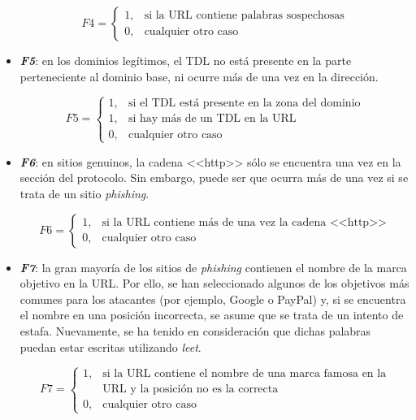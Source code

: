\begin{itemize}
	\[F4 = \left\{ \begin{array}{lr} 1, & \text{si la URL contiene palabras sospechosas}\\ 
	0, & \text{cualquier otro caso} \label{eqn:phishing_f4} \end{array} \right. \]

	\item \textit{\textbf{F5}}: en los dominios legítimos, el TDL no está presente en la parte perteneciente al dominio base, ni ocurre más de una vez en la dirección.
	
	\[F5 = \left\{ \begin{array}{lr} 1, & \text{si el TDL está presente en la zona del dominio}\\ 
	1, & \text{si hay más de un TDL en la URL} \\
	0, & \text{cualquier otro caso} \label{eqn:phishing_f5} \end{array} \right. \]
	
	
	\item \textit{\textbf{F6}}: en sitios genuinos, la cadena <<http>> sólo se encuentra una vez en la sección del protocolo. Sin embargo, puede ser que ocurra más de una vez si se trata de un sitio \textit{phishing}.
	
	\[F6 = \left\{ \begin{array}{lr} 1, & \text{si la URL contiene más de una vez la cadena <<http>>}\\ 
	0, & \text{cualquier otro caso} \label{eqn:phishing_f6} \end{array} \right. \]

	\item \textit{\textbf{F7}}: la gran mayoría de los sitios de \textit{phishing} contienen el nombre de la marca objetivo en la URL. Por ello, se han seleccionado algunos de los objetivos más comunes para los atacantes (por ejemplo, Google o PayPal) y, si se encuentra el nombre en una posición incorrecta, se asume que se trata de un intento de estafa. Nuevamente, se ha tenido en consideración que dichas palabras puedan estar escritas utilizando \textit{leet}.
	
	\[F7 = \left\{ \begin{array}{lr} 1, & \text{si la URL contiene el nombre de una marca famosa en la}\\ & \text{URL y la posición no es la correcta}\\ 
	0, & \text{cualquier otro caso} \label{eqn:phishing_f7} \end{array} \right. \]
	

\end{itemize}
